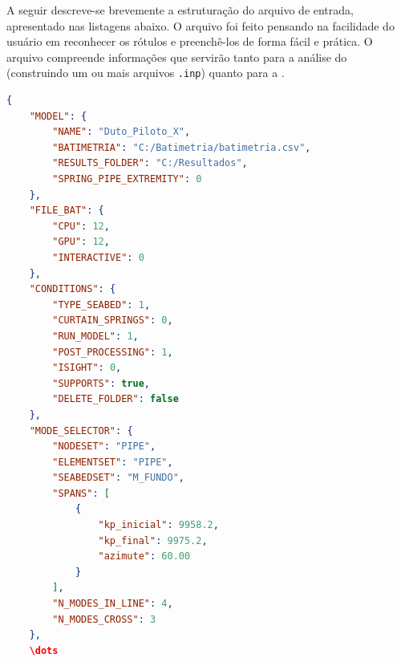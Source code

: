 A seguir descreve-se brevemente a estruturação do arquivo de entrada, apresentado nas listagens abaixo.
O arquivo foi feito pensando na facilidade do usuário em reconhecer os rótulos e preenchê-los de forma fácil e prática.
O arquivo compreende informações que servirão tanto para a análise do \abaqus (construindo um ou mais arquivos \texttt{.inp}) quanto para a \fatfree.

\begin{lstlisting}[language=json, label={tab:jdsn-arquivojson},caption={Exemplo de arquivo de entrada de dados - Parte 1/7}]
{
    "MODEL": {
        "NAME": "Duto_Piloto_X",
        "BATIMETRIA": "C:/Batimetria/batimetria.csv",
        "RESULTS_FOLDER": "C:/Resultados",
        "SPRING_PIPE_EXTREMITY": 0
    },
    "FILE_BAT": {
        "CPU": 12,
        "GPU": 12,
        "INTERACTIVE": 0
    },
    "CONDITIONS": {
        "TYPE_SEABED": 1,
        "CURTAIN_SPRINGS": 0,
        "RUN_MODEL": 1,
        "POST_PROCESSING": 1,
        "ISIGHT": 0,
        "SUPPORTS": true,
        "DELETE_FOLDER": false
    },
    "MODE_SELECTOR": {
        "NODESET": "PIPE",
        "ELEMENTSET": "PIPE",
        "SEABEDSET": "M_FUNDO",
        "SPANS": [
            {
                "kp_inicial": 9958.2,
                "kp_final": 9975.2,
                "azimute": 60.00
            }
        ],
        "N_MODES_IN_LINE": 4,
        "N_MODES_CROSS": 3
    },
    \dots
\end{lstlisting}

